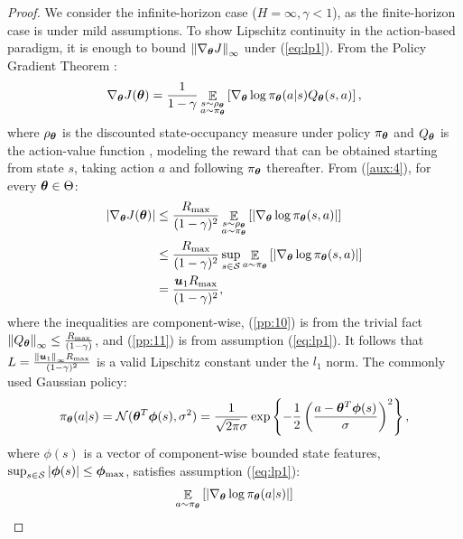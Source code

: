 \lipschitzpol*
\begin{proof}
	We consider the infinite-horizon case ($H=\infty,\gamma<1$), as the finite-horizon case is \wlg under mild assumptions.
	To show Lipschitz continuity in the action-based paradigm, it is enough to bound $\norm[\infty]{\nabla_{\vtheta}J}$ under (\ref{eq:lp1}). From the Policy Gradient Theorem \cite{sutton2000policy}:
	\begin{align}\label{aux:4}
		\nabla_{\vtheta}J(\vtheta) = \frac{1}{1-\gamma}\Exp_{\substack{s\sim \rho_{\vtheta}
		\\a\sim\pi_{\vtheta}}}\left[\nabla_{\vtheta}\log\pi_{\vtheta}(a|s)Q_{\vtheta}(s,a)\right],
	\end{align}
	where $\rho_{\vtheta}$ is the discounted state-occupancy measure under policy $\pi_{\vtheta}$ and $Q_{\vtheta}$ is the action-value function \cite{sutton2000policy}, modeling the reward that can be obtained starting from state $s$, taking action $a$ and following $\pi_{\vtheta}$ thereafter.
	From (\ref{aux:4}), for every $\vtheta\in\Theta$:
	\begin{align}
		|\nabla_{\vtheta}J(\vtheta)| 
		&\leq \frac{\Rmax}{(1-\gamma)^2}\Exp_{\substack{s\sim \rho_{\vtheta}\\a\sim\pi_{\vtheta}}}\left[|\nabla_{\vtheta}\log\pi_{\vtheta}(s,a)|\right] \label{pp:10}\\
		&\leq \frac{\Rmax}{(1-\gamma)^2}\sup_{s\in\Sspace}\Exp_{a\sim\pi_{\vtheta}}\left[|\nabla_{\vtheta}\log\pi_{\vtheta}(s,a)|\right] \nonumber\\
		& = \frac{\vu_1\Rmax}{(1-\gamma)^2}, \label{pp:11}
	\end{align}
	where the inequalities are component-wise, (\ref{pp:10}) is from the trivial fact $\norm[\infty]{Q_{\vtheta}}\leq\frac{\Rmax}{(1-\gamma)}$, and (\ref{pp:11}) is from assumption (\ref{eq:lp1}). It follows that $L=\frac{\norm[\infty]{\vu_1}\Rmax}{(1-\gamma)^2}$ is a valid Lipschitz constant under the $l_1$ norm.
	The commonly used Gaussian policy:
	\begin{align}\label{eq:gauss}
		\pi_{\vtheta}(a|s) = \mathcal{N}(\vtheta^T\vphi(s),\sigma^2)  = \frac{1}{\sqrt{2\pi}\sigma}\exp\left\{-\frac{1}{2}\left(\frac{a-\vtheta^T\vphi(s)}{\sigma}\right)^2\right\},
	\end{align}
	where $\phi(s)$ is a vector of component-wise bounded state features, \ie $\sup_{s\in\Sspace}|\vphi(s)|\leq \vphi_{\max}$, satisfies assumption (\ref{eq:lp1}):
	\begin{align}
		\Exp_{a\sim\pi_{\vtheta}}\left[\left|\nabla_{\vtheta}\log\pi_{\vtheta}(a|s)\right|\right] 

\end{align}
\end{proof}
